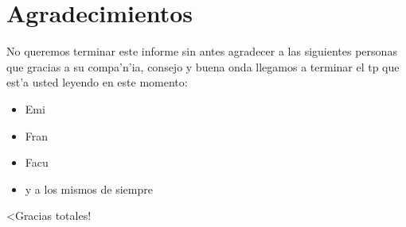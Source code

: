 \section{Agradecimientos}

	No queremos terminar este informe sin antes agradecer a las siguientes personas que gracias a su compa'n'ia, consejo y buena onda llegamos a terminar el tp que est'a usted leyendo en este momento:
\begin{itemize}
 \item Emi
 \item Fran
 \item Facu
 \item y a los mismos de siempre
\end{itemize}

	<Gracias totales!
